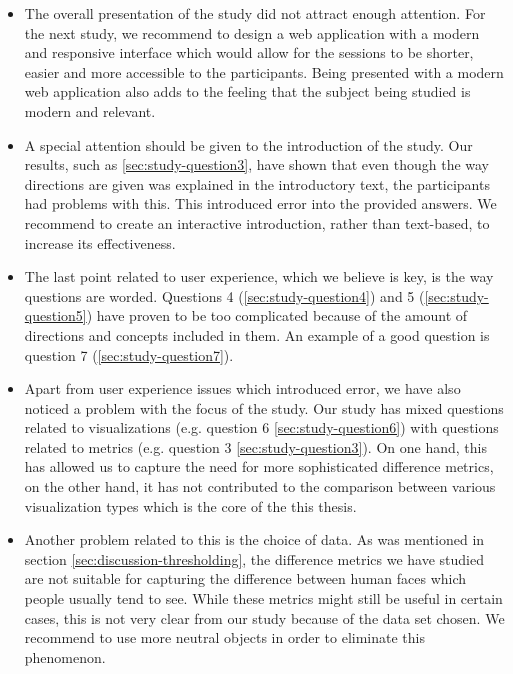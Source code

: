 \begin{itemize}
	\item The overall presentation of the study did not attract enough attention. For the next study, we recommend to design a web application with a modern and responsive interface which would allow for the sessions to be shorter, easier and more accessible to the participants. Being presented with a modern web application also adds to the feeling that the subject being studied is modern and relevant.
	\item A special attention should be given to the introduction of the study. Our results, such as \ref{sec:study-question3}, have shown that even though the way directions are given was explained in the introductory text, the participants had problems with this. This introduced error into the provided answers. We recommend to create an interactive introduction, rather than text-based, to increase its effectiveness.
	\item The last point related to user experience, which we believe is key, is the way questions are worded. Questions 4 (\ref{sec:study-question4}) and 5 (\ref{sec:study-question5}) have proven to be too complicated because of the amount of directions and concepts included in them. An example of a good question is question 7 (\ref{sec:study-question7}).
	\item Apart from user experience issues which introduced error, we have also noticed a problem with the focus of the study. Our study has mixed questions related to visualizations (e.g. question 6 \ref{sec:study-question6}) with questions related to metrics (e.g. question 3 \ref{sec:study-question3}). On one hand, this has allowed us to capture the need for more sophisticated difference metrics, on the other hand, it has not contributed to the comparison between various visualization types which is the core of the this thesis.
	\item Another problem related to this is the choice of data. As was mentioned in section \ref{sec:discussion-thresholding}, the difference metrics we have studied are not suitable for capturing the difference between human faces which people usually tend to see. While these metrics might still be useful in certain cases, this is not very clear from our study because of the data set chosen. We recommend to use more neutral objects in order to eliminate this phenomenon.
\end{itemize}

